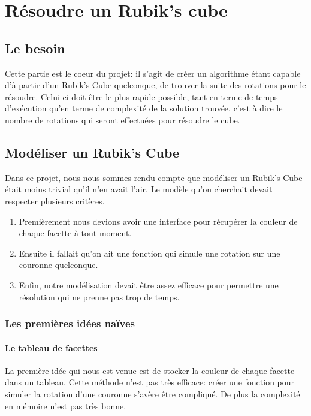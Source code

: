 \chapter{Résoudre un Rubik's cube}

\section{Le besoin}
Cette partie est le coeur du projet: il s'agit de créer un algorithme étant capable d'à partir d'un Rubik's Cube quelconque, de trouver la suite des rotations pour le résoudre. Celui-ci doit être le plus rapide possible, tant en terme de temps d'exécution qu'en terme de complexité de la solution trouvée, c'est à dire le nombre de rotations qui seront effectuées pour résoudre le cube.

\section{Modéliser un Rubik's Cube}

Dans ce projet, nous nous sommes rendu compte que modéliser un Rubik's Cube était moins trivial qu'il n'en avait l'air.
Le modèle qu'on cherchait devait respecter plusieurs critères. 
\begin{enumerate}
    \item Premièrement nous devions avoir une interface pour récupérer la couleur de chaque facette à tout moment.
    \item Ensuite il fallait qu'on ait une fonction qui simule une rotation sur une couronne quelconque.
    \item Enfin, notre modélisation devait être assez efficace pour permettre une résolution qui ne prenne pas trop de temps.
\end{enumerate}
\subsection{Les premières idées naïves}

\subsubsection{Le tableau de facettes}
La première idée qui nous est venue est de stocker la couleur de chaque facette dans un tableau.
Cette méthode n'est pas très efficace: créer une fonction pour simuler la rotation d'une couronne s'avère être compliqué.
De plus la complexité en mémoire n'est pas très bonne.


